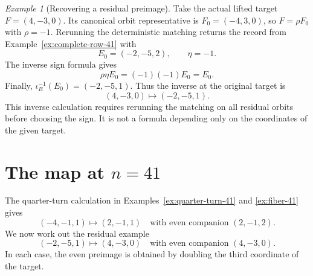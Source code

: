 \documentclass[11pt]{amsart}
\theoremstyle{definition}
\theoremstyle{remark}
\newtheorem{example}[theorem]{Example}
\begin{document}
\begin{example}[Recovering a residual preimage]
\label{ex:inverse-41}
Take the actual lifted target $F=(4,-3,0)$.  Its canonical orbit
representative is $F_0=(-4,3,0)$, so $F=\rho F_0$ with $\rho=-1$.
Rerunning the deterministic matching returns the record from
Example~\ref{ex:complete-row-41} with
\[
 E_0=(-2,-5,2),
 \qquad
 \eta=-1.
\]
The inverse sign formula gives
\[
 \rho\eta E_0=(-1)(-1)E_0=E_0.
\]
Finally, $\iota_B^{-1}(E_0)=(-2,-5,1)$.  Thus the inverse at the original
target is
\[
 (4,-3,0)\longmapsto(-2,-5,1).
\]
This inverse calculation requires rerunning the matching on all residual
orbits before choosing the sign.  It is not a formula depending only on the
coordinates of the given target.
\end{example}

\section{The map at \texorpdfstring{$n=41$}{n=41}}
\label{sec:example}

The quarter-turn calculation in Examples~\ref{ex:quarter-turn-41} and
\ref{ex:fiber-41} gives
\[
 (-4,-1,1)\longmapsto(2,-1,1)
 \quad\text{with even companion }(2,-1,2).
\]
We now work out the residual example
\[
 (-2,-5,1)\longmapsto(4,-3,0)
 \quad\text{with even companion }(4,-3,0).
\]
In each case, the even preimage is obtained by doubling the third coordinate
of the target.
\end{document}
